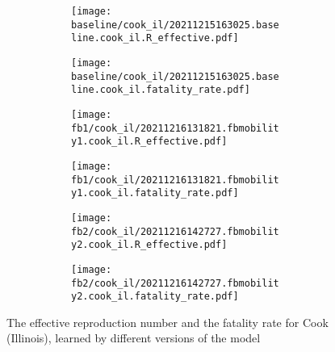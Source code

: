 \begin{figure}[!htb]
    \centering

    \begin{subfigure}[b]{\linewidth}
        \centering
        \begin{subfigure}[b]{0.4\linewidth}
            \texttt{[image: baseline/cook\_il/20211215163025.baseline.cook\_il.R\_effective.pdf]}
        \end{subfigure}
        \begin{subfigure}[b]{0.4\linewidth}
            \texttt{[image: baseline/cook\_il/20211215163025.baseline.cook\_il.fatality\_rate.pdf]}
        \end{subfigure}
    \end{subfigure}

    \begin{subfigure}[b]{\linewidth}
        \centering
        \begin{subfigure}[b]{0.4\linewidth}
            \texttt{[image: fb1/cook\_il/20211216131821.fbmobility1.cook\_il.R\_effective.pdf]}
        \end{subfigure}
        \begin{subfigure}[b]{0.4\linewidth}
            \texttt{[image: fb1/cook\_il/20211216131821.fbmobility1.cook\_il.fatality\_rate.pdf]}
        \end{subfigure}
    \end{subfigure}

    \begin{subfigure}[b]{\linewidth}
        \centering
        \begin{subfigure}[b]{0.4\linewidth}
            \texttt{[image: fb2/cook\_il/20211216142727.fbmobility2.cook\_il.R\_effective.pdf]}
        \end{subfigure}
        \begin{subfigure}[b]{0.4\linewidth}
            \texttt{[image: fb2/cook\_il/20211216142727.fbmobility2.cook\_il.fatality\_rate.pdf]}
        \end{subfigure}
    \end{subfigure}

    \caption{The effective reproduction number and the fatality rate for Cook (Illinois), learned by different versions of the model}
    \label{fig:R0-and-fatality-cook}
\end{figure}

